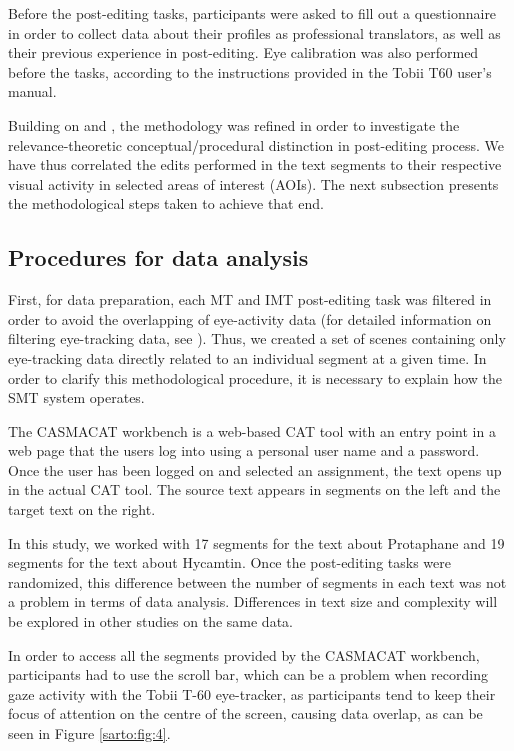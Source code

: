 \documentclass[output=paper]{langsci/langscibook}
\begin{document}
Before the post-editing tasks, participants were asked to fill out a questionnaire in order to collect data about their profiles as professional translators, as well as their previous experience in post-editing. Eye calibration was also performed before the tasks, according to the instructions provided in the Tobii T60 user’s manual.



Building on \citet{alves2012} and \citet{alves2013}, the methodology was refined in order to investigate the relevance-theoretic conceptual/procedural distinction in post-editing process. We have thus correlated the edits performed in the text segments to their respective visual activity in selected areas of interest (AOIs). The next subsection presents the methodological steps taken to achieve that end.


\subsection{Procedures for data analysis}

First, for data preparation, each MT and IMT post-editing task was filtered in order to avoid the overlapping of eye-activity data (for detailed information on filtering eye-tracking data, see \citet{alves2012}). Thus, we created a set of scenes containing only eye-tracking data directly related to an individual segment at a given time. In order to clarify this methodological procedure, it is necessary to explain how the SMT system operates.  


The CASMACAT workbench is a web-based CAT tool with an entry point in a web page that the users log into using a personal user name and a password. Once the user has been logged on and selected an assignment, the text opens up in the actual CAT tool. The source text appears in segments on the left and the target text on the right. 



In this study, we worked with 17 segments for the text about Protaphane and 19 segments for the text about Hycamtin. Once the post-editing tasks were randomized, this difference between the number of segments in each text was not a problem in terms of data analysis. Differences in text size and complexity will be explored in other studies on the same data. 



In order to access all the segments provided by the CASMACAT workbench,  participants had to use the scroll bar, which can be a problem when recording gaze activity with the Tobii T-60 eye-tracker, as participants tend to keep their focus of attention on the centre of the screen, causing data overlap, as can be seen in Figure \ref{sarto:fig:4}. 
\end{document}
